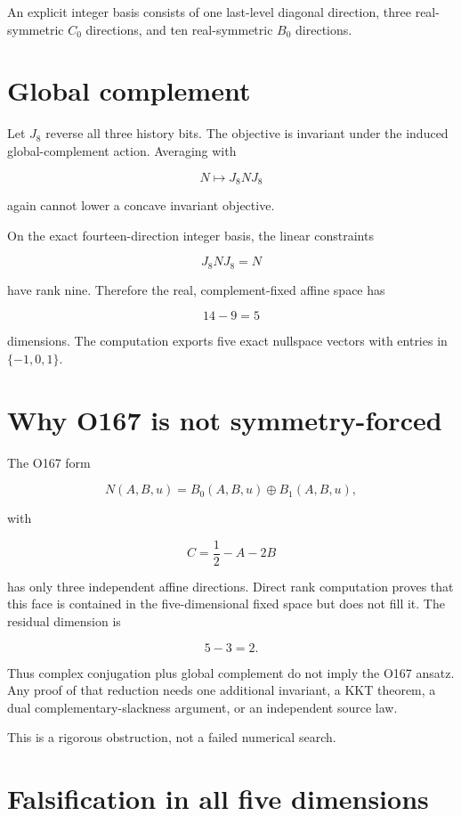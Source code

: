 \documentclass[11pt,a4paper,openany]{report}
\begin{document}
An explicit integer basis consists of one last-level diagonal direction, three real-symmetric \(C_0\) directions, and ten real-symmetric \(B_0\) directions.

\section{Global complement}

Let \(J_8\) reverse all three history bits. The objective is invariant under the induced global-complement action. Averaging with

\[
N\mapsto J_8NJ_8
\]

again cannot lower a concave invariant objective.

On the exact fourteen-direction integer basis, the linear constraints

\[
J_8NJ_8=N
\]

have rank nine. Therefore the real, complement-fixed affine space has

\[
14-9=5
\]

dimensions. The computation exports five exact nullspace vectors with entries in \(\{-1,0,1\}\).

\section{Why O167 is not symmetry-forced}

The O167 form

\[
N(A,B,u)=B_0(A,B,u)\oplus B_1(A,B,u),
\]

with

\[
C=\frac12-A-2B
\]

has only three independent affine directions. Direct rank computation proves that this face is contained in the five-dimensional fixed space but does not fill it. The residual dimension is

\[
5-3=2.
\]

Thus complex conjugation plus global complement do not imply the O167 ansatz. Any proof of that reduction needs one additional invariant, a KKT theorem, a dual complementary-slackness argument, or an independent source law.

This is a rigorous obstruction, not a failed numerical search.

\section{Falsification in all five dimensions}
\end{document}
